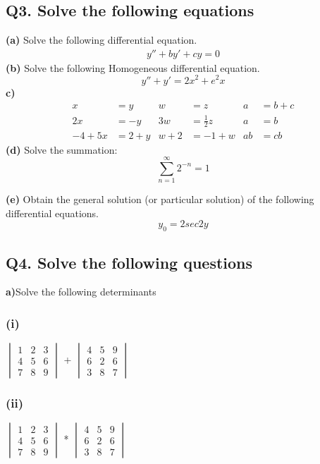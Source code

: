 \documentclass[12pt]{article}
\begin{document}
\subsection*{Q3. Solve the following equations}
\textbf{(a)} Solve the following differential equation.
\begin{align}
 y'' + by' + cy = 0  
\end{align}
\textbf{(b)} Solve the following Homogeneous differential equation.
\begin{equation*}
 y''+y'=2x^2+e^2x
\end{equation*}
\textbf{c)}
\begin{align*}
x&=y           &  w &=z              &  a&=b+c\\
2x&=-y         &  3w&=\frac{1}{2}z   &  a&=b\\
-4 + 5x&=2+y   &  w+2&=-1+w          &  ab&=cb
\end{align*}
\textbf{(d)}
Solve the summation:\\
\[ \sum_{n=1}^{\infty} 2^{-n} = 1 \]


\textbf{(e)} Obtain the general solution (or particular solution) of the following differential equations. 
\begin{equation*}
y_0 = 2 sec 2y
\end{equation*}


\subsection*{Q4. Solve the following questions}
\textbf{a)}Solve the following determinants
\subsubsection*{(i)}
$\begin{vmatrix}
1 & 2 & 3\\
4 & 5 & 6\\
7 & 8 & 9
\end{vmatrix}$
+
$\begin{vmatrix}
4 & 5 & 9\\
6 & 2 & 6\\
3 & 8 & 7
\end{vmatrix}$

\subsubsection*{(ii)}
$\begin{vmatrix}
1 & 2 & 3\\
4 & 5 & 6\\
7 & 8 & 9
\end{vmatrix}$
*
$\begin{vmatrix}
4 & 5 & 9\\
6 & 2 & 6\\
3 & 8 & 7
\end{vmatrix}$
\vspace{5mm}
\end{document}
